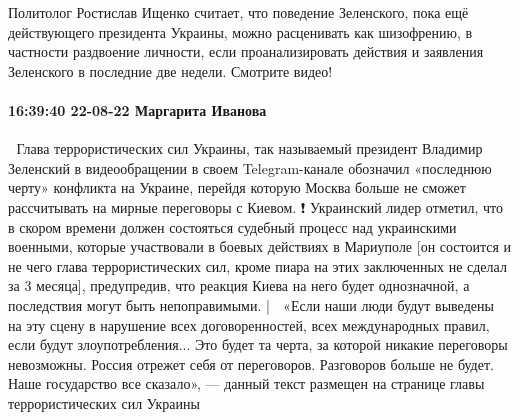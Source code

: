 Политолог Ростислав Ищенко считает, что поведение Зеленского, пока ещё
действующего президента Украины, можно расценивать как шизофрению, в частности
раздвоение личности, если проанализировать действия и заявления Зеленского в
последние две недели.
Смотрите видео!

\paragraph{16:39:40 22-08-22 Маргарита Иванова}

📢 Глава террористических сил Украины, так называемый президент Владимир Зеленский в видеообращении в своем Telegram-канале обозначил «последнюю черту» конфликта на Украине, перейдя которую Москва больше не сможет рассчитывать на мирные переговоры с Киевом.
❗ Украинский лидер отметил, что в скором времени должен состояться судебный процесс над украинскими военными, которые участвовали в боевых действиях в Мариуполе [он состоится и не чего глава террористических сил, кроме пиара на этих заключенных не сделал за 3 месяца], предупредив, что реакция Киева на него будет однозначной, а последствия могут быть непоправимыми.
| 📰 «Если наши люди будут выведены на эту сцену в нарушение всех договоренностей, всех международных правил, если будут злоупотребления... Это будет та черта, за которой никакие переговоры невозможны. Россия отрежет себя от переговоров. Разговоров больше не будет. Наше государство все сказало», — данный текст размещен на странице главы террористических сил Украины

